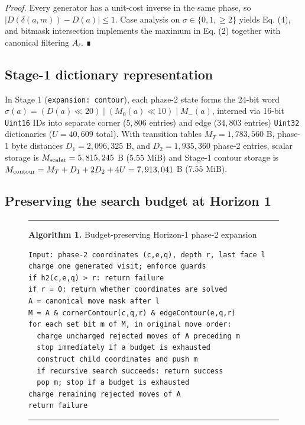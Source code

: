 \documentclass[10pt,twocolumn,letterpaper]{article}
\begin{document}
\emph{Proof.} Every generator has a unit-cost inverse in the same phase,
so \(|D(\delta(a,m)) - D(a)| \le 1\). Case analysis on
\(\sigma \in \{0, 1, \ge 2\}\) yields Eq. (4), and bitmask intersection
implements the maximum in Eq. (2) together with canonical filtering
\(A_\ell\). ∎

\hypertarget{stage-1-dictionary-representation}{%
\subsection{Stage-1 dictionary representation}\label{stage-1-dictionary-representation}}

In Stage 1
(\texttt{expansion:\ \textquotesingle{}contour\textquotesingle{}}), each
phase-2 state forms the 24-bit word
\(\sigma(a)=(D(a)\ll 20)\mathbin{|}(M_0(a)\ll 10)\mathbin{|}M_-(a)\),
interned via 16-bit \texttt{Uint16} IDs into separate corner (\(5,806\)
entries) and edge (\(34,803\) entries) \texttt{Uint32} dictionaries
(\(U=40,609\) total). With transition tables \(M_T=1,783,560\) B,
phase-1 byte distances \(D_1=2,096,325\) B, and \(D_2=1,935,360\)
phase-2 entries, scalar storage is \(M_{\rm scalar}=5,815,245\) B
(\(5.55\) MiB) and Stage-1 contour storage is
\(M_{\rm contour}=M_T+D_1+2D_2+4U=7,913,041\) B (\(7.55\) MiB).

\hypertarget{preserving-the-search-budget-at-horizon-1}{%
\subsection{Preserving the search budget at Horizon 1}\label{preserving-the-search-budget-at-horizon-1}}

\begin{figure}[t]
\hrule\vspace{5pt}
\textbf{Algorithm 1.} Budget-preserving Horizon-1 phase-2 expansion
\vspace{4pt}
\begin{Verbatim}[fontsize=\footnotesize,breaklines=true,breakanywhere=true]
Input: phase-2 coordinates (c,e,q), depth r, last face l
charge one generated visit; enforce guards
if h2(c,e,q) > r: return failure
if r = 0: return whether coordinates are solved
A = canonical move mask after l
M = A & cornerContour(c,q,r) & edgeContour(e,q,r)
for each set bit m of M, in original move order:
  charge uncharged rejected moves of A preceding m
  stop immediately if a budget is exhausted
  construct child coordinates and push m
  if recursive search succeeds: return success
  pop m; stop if a budget is exhausted
charge remaining rejected moves of A
return failure
\end{Verbatim}
\vspace{3pt}\hrule
\end{figure}
\end{document}
